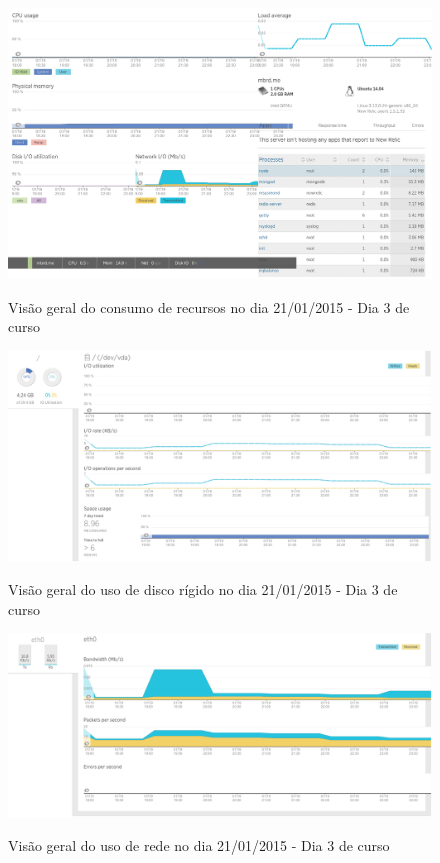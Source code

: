 \documentclass[
	12pt,				%
	oneside,			%
	a4paper,			%
	english,			%
	brazil				%
	]{abntex2ppgsi}
\begin{document}
\begin{apendicesenv}
\begin{figure}[h]
\centering
\caption{Visão geral do consumo de recursos no dia 21/01/2015 - Dia 3 de curso}
\includegraphics[width=1.0\textwidth]{relatorios/21-01-15/dashboard_cropped.pdf} 
\label{fig:recursos_dia1_1} 
\end{figure}

\begin{figure}[h]
\centering
\caption{Visão geral do uso de disco rígido no dia 21/01/2015 - Dia 3 de curso}
\includegraphics[width=1.0\textwidth]{relatorios/21-01-15/disk_cropped.pdf} 
\label{fig:recursos_dia1_2} 
\end{figure}

\begin{figure}[h]
\centering
\caption{Visão geral do uso de rede no dia 21/01/2015 - Dia 3 de curso}
\includegraphics[width=1.0\textwidth]{relatorios/21-01-15/network_cropped.pdf} 
\label{fig:recursos_dia1_3} 
\end{figure}


\end{apendicesenv}
\end{document}
